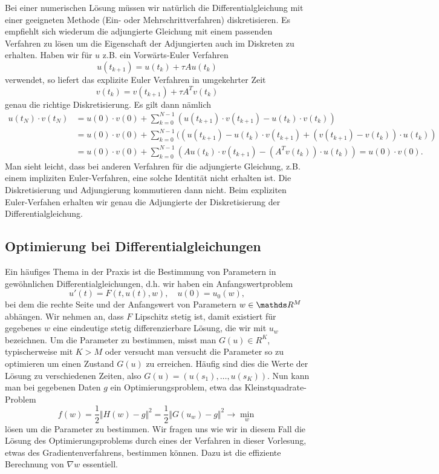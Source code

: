 Bei einer numerischen Lösung müssen wir natürlich die Differentialgleichung mit einer geeigneten Methode (Ein- oder Mehrschrittverfahren) diskretisieren. Es empfiehlt sich wiederum die adjungierte Gleichung mit einem passenden Verfahren zu lösen um die Eigenschaft der Adjungierten auch im Diskreten zu erhalten. Haben wir für $u$ z.B. ein Vorwärts-Euler Verfahren 
$$ u(t_{k+1}) = u(t_k) + \tau A u(t_k) $$
verwendet, so liefert das explizite Euler Verfahren in umgekehrter Zeit
$$ v(t_k) = v(t_{k+1}) + \tau A^T v(t_k)$$
genau die richtige Diskretisierung. Es gilt dann nämlich
\begin{align*}
	u(t_N) \cdot v(t_N) &= u(0) \cdot v(0) + \sum_{k=0}^{N-1} (u(t_{k+1}) \cdot v(t_{k+1}) - u(t_{k })  \cdot v(t_{k })) \\
	 &= u(0) \cdot v(0) + \sum_{k=0}^{N-1} ((u(t_{k+1})  - u(t_{k }) \cdot v(t_{k+1}) + (v(t_{k+1}) - v(t_{k })) \cdot u(t_k) ) \\
	 &= u(0) \cdot v(0) + \sum_{k=0}^{N-1} (A u(t_{k })\cdot v(t_{k+1}) - (A^T v(t_{k })) \cdot u(t_k) ) = u(0)\cdot v(0) .
\end{align*}
Man sieht leicht, dass bei anderen Verfahren für die adjungierte Gleichung, z.B. einem impliziten Euler-Verfahren, eine solche Identität nicht erhalten ist. Die Diskretisierung und Adjungierung kommutieren dann nicht. Beim expliziten Euler-Verfahen erhalten wir genau die Adjungierte der Diskretisierung der Differentialgleichung.

\subsection{Optimierung bei Differentialgleichungen}

Ein häufiges Thema in der Praxis ist die Bestimmung von Parametern in gewöhnlichen Differentialgleichungen, d.h. wir haben ein Anfangswertproblem
$$ u'(t) = F(t,u(t),w), \quad u(0) = u_0(w), $$
bei dem die rechte Seite und der Anfangswert von Parametern $w \in \R^M$ abhängen. Wir nehmen an, dass $F$ Lipschitz stetig ist, damit existiert für gegebenes $w$ eine eindeutige stetig differenzierbare Lösung, die wir mit $u_w$ bezeichnen. Um die Parameter zu bestimmen, misst man $G(u) \in R^K$, typischerweise mit $K > M$ oder versucht man versucht die Parameter so zu optimieren um einen Zustand $G(u)$ zu erreichen. Häufig sind dies die Werte der Lösung zu verschiedenen Zeiten, also $G(u) = (u(s_1), \ldots, u(s_K))$. Nun kann man bei gegebenen Daten $g$ ein Optimierungsproblem, etwa das Kleinstquadrate-Problem 
$$ f(w) = \frac{1}2 \Vert H(w) - g \Vert^2  = \frac{1}2 \Vert G(u_w) - g \Vert^2 \rightarrow \min_w $$
lösen um die Parameter zu bestimmen.  Wir fragen uns wie wir in diesem Fall die Lösung des Optimierungsproblems durch eines der Verfahren in dieser Vorlesung, etwas des Gradientenverfahrens, bestimmen können. Dazu ist die effiziente Berechnung von $\nabla w$ essentiell. 

